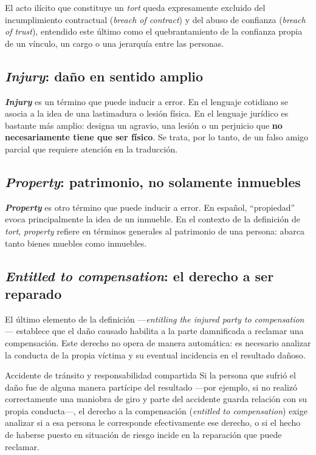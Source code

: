 \documentclass[12pt,oneside]{book}
\begin{document}
El acto ilícito que constituye un \textit{tort} queda expresamente excluido del incumplimiento contractual (\textit{breach of contract}) y del abuso de confianza (\textit{breach of trust}), entendido este último como el quebrantamiento de la confianza propia de un vínculo, un cargo o una jerarquía entre las personas.

\subsection{\textit{Injury}: daño en sentido amplio}

\begin{important}
\textbf{\textit{Injury}} es un término que puede inducir a error. En el lenguaje cotidiano se asocia a la idea de una lastimadura o lesión física. En el lenguaje jurídico es bastante más amplio: designa un agravio, una lesión o un perjuicio que \textbf{no necesariamente tiene que ser físico}. Se trata, por lo tanto, de un falso amigo parcial que requiere atención en la traducción.
\end{important}

\subsection{\textit{Property}: patrimonio, no solamente inmuebles}

\begin{important}
\textbf{\textit{Property}} es otro término que puede inducir a error. En español, ``propiedad'' evoca principalmente la idea de un inmueble. En el contexto de la definición de \textit{tort}, \textit{property} refiere en términos generales al patrimonio de una persona: abarca tanto bienes muebles como inmuebles.
\end{important}

\subsection{\textit{Entitled to compensation}: el derecho a ser reparado}

El último elemento de la definición ---\textit{entitling the injured party to compensation}--- establece que el daño causado habilita a la parte damnificada a reclamar una compensación. Este derecho no opera de manera automática: es necesario analizar la conducta de la propia víctima y su eventual incidencia en el resultado dañoso.

\begin{example}{Accidente de tránsito y responsabilidad compartida}
Si la persona que sufrió el daño fue de alguna manera partícipe del resultado ---por ejemplo, si no realizó correctamente una maniobra de giro y parte del accidente guarda relación con su propia conducta---, el derecho a la compensación (\textit{entitled to compensation}) exige analizar si a esa persona le corresponde efectivamente ese derecho, o si el hecho de haberse puesto en situación de riesgo incide en la reparación que puede reclamar.
\end{example}
\end{document}
